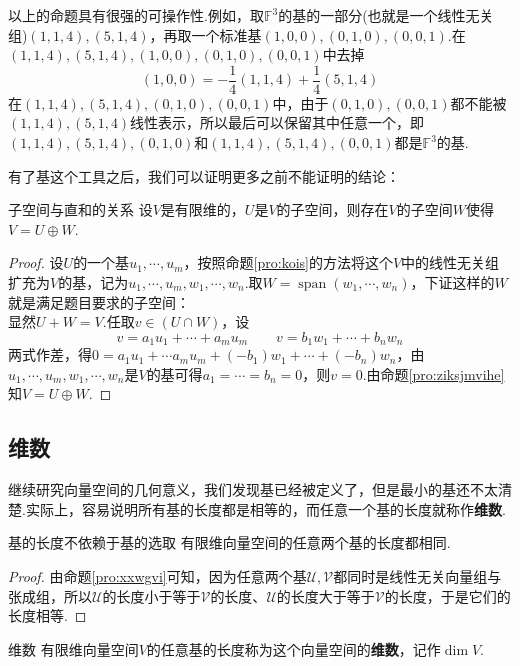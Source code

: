 \documentclass[lang=cn, zihao=5]{elegantbook}
\newcommand{\F}{\mathbb{F}}
\DeclareMathOperator{\spn}{span}
\begin{document}
以上的命题具有很强的可操作性.例如，取$\F ^{3}$的基的一部分(也就是一个线性无关组)$(1,1,4),(5,1,4)$，再取一个标准基$(1,0,0),(0,1,0),(0,0,1)$.在$(1,1,4),(5,1,4),(1,0,0),(0,1,0),(0,0,1)$中去掉$$(1,0,0)=-\frac{1}{4}(1,1,4)+\frac{1}{4}(5,1,4)$$
在$(1,1,4),(5,1,4),(0,1,0),(0,0,1)$中，由于$(0,1,0),(0,0,1)$都不能被$(1,1,4),(5,1,4)$线性表示，所以最后可以保留其中任意一个，即$(1,1,4),(5,1,4),(0,1,0)$和$(1,1,4),(5,1,4),(0,0,1)$都是$\F ^{3}$的基.

有了基这个工具之后，我们可以证明更多之前不能证明的结论：

\begin{proposition}{子空间与直和的关系}
	设$V$是有限维的，$U$是$V$的子空间，则存在$V$的子空间$W$使得$V=U \oplus W$.
\end{proposition}
\begin{proof}
	设$U$的一个基$u_1, \cdots , u_m$，按照命题\ref{pro:kois}的方法将这个$V$中的线性无关组扩充为$V$的基，记为$u_1, \cdots ,u_m,w_1, \cdots ,w_n$.取$W = \spn (w_1, \cdots ,w_n)$，下证这样的$W$就是满足题目要求的子空间： \\
	显然$U+W=V$.任取$v \in (U \cap W)$，设$$v=a_1u_1 + \cdots + a_mu
	_m \qquad v = b_1w_1 + \cdots + b_nw_n$$
	两式作差，得$0=a_1u_1 + \cdots a_mu_m + (-b_1)w_1 + \cdots + (-b_n)w_n$，由$u_1, \cdots ,u_m,w_1, \cdots ,w_n$是$V$的基可得$a_1 = \cdots = b_n = 0$，则$v=0$.由命题\ref{pro:ziksjmvihe}知$V=U \oplus W$.
\end{proof}

\subsection{维数}

继续研究向量空间的几何意义，我们发现基已经被定义了，但是最小的基还不太清楚.实际上，容易说明所有基的长度都是相等的，而任意一个基的长度就称作\textbf{维数}.

\begin{proposition}{基的长度不依赖于基的选取}
	有限维向量空间的任意两个基的长度都相同.
\end{proposition}
\begin{proof}
	由命题\ref{pro:xxwgvi}可知，因为任意两个基$\mathcal{U},\mathcal{V}$都同时是线性无关向量组与张成组，所以$\mathcal{U}$的长度小于等于$\mathcal{V}$的长度、$\mathcal{U}$的长度大于等于$\mathcal{V}$的长度，于是它们的长度相等.
\end{proof}

\begin{definition}{维数}
	有限维向量空间$V$的任意基的长度称为这个向量空间的\textbf{维数}，记作$\dim V$.
\end{definition}
\end{document}
